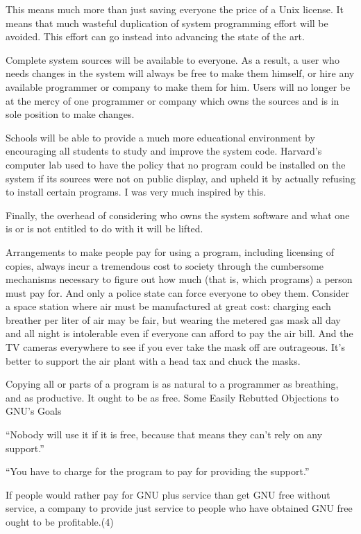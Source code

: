 This means much more than just saving everyone the price of a Unix license. It means that much wasteful duplication of system programming effort will be avoided. This effort can go instead into advancing the state of the art.

Complete system sources will be available to everyone. As a result, a user who needs changes in the system will always be free to make them himself, or hire any available programmer or company to make them for him. Users will no longer be at the mercy of one programmer or company which owns the sources and is in sole position to make changes.

Schools will be able to provide a much more educational environment by encouraging all students to study and improve the system code. Harvard's computer lab used to have the policy that no program could be installed on the system if its sources were not on public display, and upheld it by actually refusing to install certain programs. I was very much inspired by this.

Finally, the overhead of considering who owns the system software and what one is or is not entitled to do with it will be lifted.

Arrangements to make people pay for using a program, including licensing of copies, always incur a tremendous cost to society through the cumbersome mechanisms necessary to figure out how much (that is, which programs) a person must pay for. And only a police state can force everyone to obey them. Consider a space station where air must be manufactured at great cost: charging each breather per liter of air may be fair, but wearing the metered gas mask all day and all night is intolerable even if everyone can afford to pay the air bill. And the TV cameras everywhere to see if you ever take the mask off are outrageous. It's better to support the air plant with a head tax and chuck the masks.

Copying all or parts of a program is as natural to a programmer as breathing, and as productive. It ought to be as free.
Some Easily Rebutted Objections to GNU's Goals

“Nobody will use it if it is free, because that means they can't rely on any support.”

“You have to charge for the program to pay for providing the support.”

If people would rather pay for GNU plus service than get GNU free without service, a company to provide just service to people who have obtained GNU free ought to be profitable.(4)


